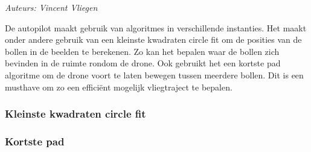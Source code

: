 {\em Auteurs: Vincent  Vliegen}

\noindent
De autopilot maakt gebruik van algoritmes in verschillende instanties. Het maakt onder andere gebruik van een kleinste kwadraten circle fit om de posities van de bollen in de beelden te berekenen. Zo kan het bepalen waar de bollen zich bevinden in de ruimte rondom de drone. Ook gebruikt het een kortste pad algoritme om de drone voort te laten bewegen tussen meerdere bollen. Dit is een musthave om zo een effici\"ent mogelijk vliegtraject te bepalen.

\subsubsection{Kleinste kwadraten circle fit}
\label{subsec: Kleinste kwadraten circle fit}


\subsubsection{Kortste pad}
\label{subsec: Kortste pad}
